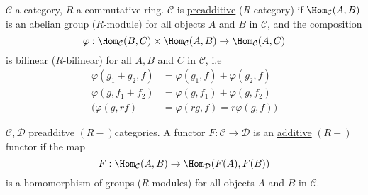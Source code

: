 
\begin{defin}
$\mathcal{C}$ a category, $R$ a commutative ring. $\mathcal{C}$ is \underline{preadditive} ($R$-category) if $\Hom_\mathcal{C}(A,B)$ is an abelian group ($R$-module) for all objects $A$ and $B$ in $\mathcal{C}$, and the composition \[ \varphi: \Hom_\mathcal{C}(B,C) \times \Hom_\mathcal{C}(A,B) \to \Hom_\mathcal{C}(A,C) \] is bilinear ($R$-bilinear) for all $A,B$ and $C$ in $\mathcal{C}$, i.e
\begin{equation*}
\begin{split}
\varphi(g_1 + g_2, f) &= \varphi(g_1,f) + \varphi(g_2, f)\\
\varphi(g, f_1 + f_2) &= \varphi(g, f_1) + \varphi(g, f_2)\\
\Big(\varphi(g, rf) &= \varphi(rg, f) = r\varphi(g,f)\Big)
\end{split}
\end{equation*}
\end{defin}

\begin{defin}
$\mathcal{C}, \mathcal{D}$ preadditve $(R-)$categories. A functor $F: \mathcal{C} \to \mathcal{D}$ is an \underline{additive} $(R-)$functor if the map \[ F: \Hom_\mathcal{C}(A, B) \to \Hom_\mathcal{D}(F(A), F(B))\] is a homomorphism of groups ($R$-modules) for all objects $A$ and $B$ in $\mathcal{C}$.
\end{defin}


